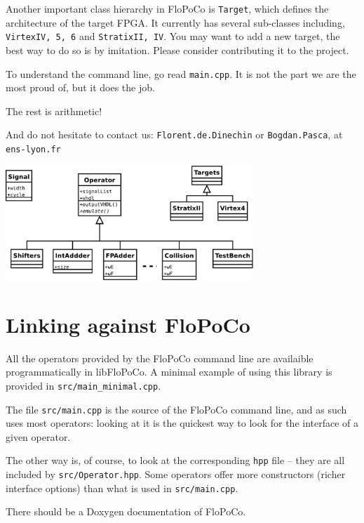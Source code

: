 \documentclass{article}
\begin{document}
Another important class hierarchy in FloPoCo is \texttt{Target}, which
defines the architecture of the target FPGA. It currently has several sub-classes 
including, \texttt{VirtexIV, 5, 6} and \texttt{StratixII, IV}. You may want to
add a new target, the best way to do so is by imitation. Please
consider contributing it to the project.

To understand the command line, go read \texttt{main.cpp}. It is not
the part we are the most proud of, but it does the job.

The rest is arithmetic!

And do not hesitate to contact us: \texttt{Florent.de.Dinechin} or
\texttt{Bogdan.Pasca}, at \texttt{ens-lyon.fr}

\begin{center}
  \includegraphics[width=0.7\textwidth]{../Figures/FloPoCoClasses.pdf}        
\end{center}

\section{Linking against FloPoCo\label{sec:linking}}
All the operators provided by the FloPoCo command line are availaible
programmatically in libFloPoCo. A minimal example of using this
library is provided in \texttt{src/main\_minimal.cpp}.

The file \texttt{src/main.cpp} is the source of the FloPoCo command
line, and as such uses most operators: looking at it is the quickest
way to look for the interface of a given operator.

The other way is, of course, to look at the corresponding \texttt{hpp}
file -- they are all included by \texttt{src/Operator.hpp}. Some
operators offer more constructors (richer interface options) than what
is used in \texttt{src/main.cpp}.

There should be a Doxygen documentation of FloPoCo.
\end{document}
